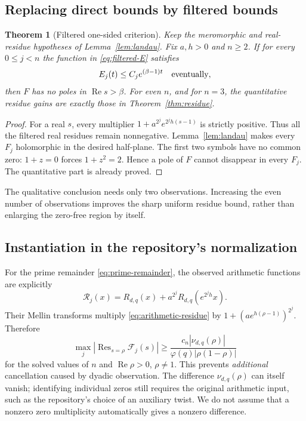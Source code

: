 \documentclass[11pt,a4paper]{article}
\newtheorem{theorem}{Theorem}[section]
\theoremstyle{definition}\newtheorem{definition}[theorem]{Definition}
\theoremstyle{remark}\newtheorem{remark}[theorem]{Remark}
\newcommand{\Res}{\operatorname{Res}}
\newcommand{\Rea}{\operatorname{Re}}
\begin{document}
\subsection{Replacing direct bounds by filtered bounds}
\begin{theorem}[Filtered one-sided criterion]\label{thm:filtered-landau}
Keep the meromorphic and real-residue hypotheses of Lemma~\ref{lem:landau}. Fix $a,h>0$ and $n\ge2$. If for every $0\le j<n$ the function in \eqref{eq:filtered-E} satisfies
\[
E_j(t)\le C_j e^{(\beta-1)t}\quad\hbox{eventually},
\]
then $F$ has no poles in $\Rea s>\beta$.
For even $n$, and for $n=3$, the quantitative residue gains are exactly those in Theorem~\ref{thm:residue}.
\end{theorem}
\begin{proof}
For a real $s$, every multiplier $1+a^{2^j}e^{2^j h(s-1)}$ is strictly positive. Thus all the filtered real residues remain nonnegative. Lemma~\ref{lem:landau} makes every $F_j$ holomorphic in the desired half-plane. The first two symbols have no common zero: $1+z=0$ forces $1+z^2=2$. Hence a pole of $F$ cannot disappear in every $F_j$. The quantitative part is already proved.
\end{proof}
The qualitative conclusion needs only two observations. Increasing the even number of observations improves the sharp uniform residue bound, rather than enlarging the zero-free region by itself.

\subsection{Instantiation in the repository's normalization}
For the prime remainder \eqref{eq:prime-remainder}, the observed arithmetic functions are explicitly
\begin{equation}\label{eq:arith-filter}
\mathcal R_j(x)=R_{d,q}(x)+a^{2^j}R_{d,q}(e^{2^j h}x).
\end{equation}
Their Mellin transforms multiply \eqref{eq:arithmetic-residue} by
$1+(a e^{h(\rho-1)})^{2^j}$. Therefore
\begin{equation}\label{eq:arith-gain}
\max_j\left|\Res_{s=\rho}\mathcal F_j(s)\right|
\ge\frac{c_n|\nu_{d,q}(\rho)|}{\varphi(q)|\rho(1-\rho)|}
\end{equation}
for the solved values of $n$ and $\Rea\rho>0$, $\rho\ne1$. This prevents \emph{additional} cancellation caused by dyadic observation. The difference $\nu_{d,q}(\rho)$ can itself vanish; identifying individual zeros still requires the original arithmetic input, such as the repository's choice of an auxiliary twist. We do not assume that a nonzero zero multiplicity automatically gives a nonzero difference.
\end{document}
